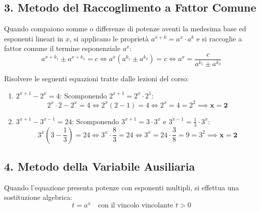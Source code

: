 \documentclass[11pt,a4paper,oneside]{report}
\begin{document}
\subsection{3. Metodo del Raccoglimento a Fattor Comune}
Quando compaiono somme o differenze di potenze aventi la medesima base ed esponenti lineari in $x$, si applicano le proprietà $a^{x+k} = a^x \cdot a^k$ e si raccoglie a fattor comune il termine esponenziale $a^x$:
\begin{equation}
    a^{x+k_1} \pm a^{x+k_2} = c \iff a^x \left(a^{k_1} \pm a^{k_2}\right) = c \iff a^x = \frac{c}{a^{k_1} \pm a^{k_2}}
\end{equation}

\begin{esempio}
Risolvere le seguenti equazioni tratte dalle lezioni del corso:
\begin{enumerate}[label=\textbf{\alph*.}]
    \item $2^{x+1} - 2^x = 4$:\newline
    Scomponendo $2^{x+1} = 2^x \cdot 2^1$:
    \begin{equation*}
        2^x \cdot 2 - 2^x = 4 \iff 2^x(2 - 1) = 4 \iff 2^x = 4 = 2^2 \implies \mathbf{x = 2}
    \end{equation*}
    \item $3^{x+1} - 3^{x-1} = 24$:\newline
    Scomponendo $3^{x+1} = 3 \cdot 3^x$ e $3^{x-1} = \frac{1}{3} \cdot 3^x$:
    \begin{equation*}
        3^x\left(3 - \frac{1}{3}\right) = 24 \iff 3^x \cdot \frac{8}{3} = 24 \iff 3^x = 24 \cdot \frac{3}{8} = 9 = 3^2 \implies \mathbf{x = 2}
    \end{equation*}
\end{enumerate}
\end{esempio}

\subsection{4. Metodo della Variabile Ausiliaria}
Quando l'equazione presenta potenze con esponenti multipli, si effettua una sostituzione algebrica:
\begin{equation}
    t = a^x \quad \text{con il vincolo vincolante } t > 0
\end{equation}
\end{document}
